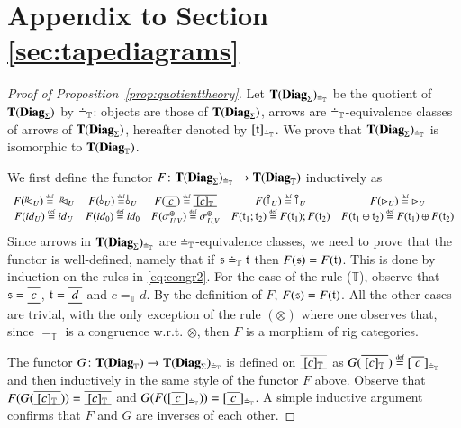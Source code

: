 
\section{Appendix to Section \ref{sec:tapediagrams}}\label{app:sec:tapediagrams}


\begin{proof}[Proof of Proposition~\ref{prop:quotienttheory}]
Let $\mathbf{T}(\mathbf{Diag}_{\Sigma})_{\doteq_{\mathbb{T}}}$ be the quotient of $\mathbf{T}(\mathbf{Diag}_{\Sigma})$ by $\doteq_{\mathbb{T}}$: objects are those of  $\mathbf{T}(\mathbf{Diag}_{\Sigma})$, arrows are $\doteq_{\mathbb{T}}$-equivalence classes of arrows of $\mathbf{T}(\mathbf{Diag}_{\Sigma})$, hereafter denoted by $[\mathfrak{t}]_{\doteq_{\mathbb{T}}}$. We prove that $\mathbf{T}(\mathbf{Diag}_{\Sigma})_{\doteq_{\mathbb{T}}}$ is isomorphic to $\mathbf{T}(\mathbf{Diag}_{\mathbb{T}})$.

We first define the functor $F \colon \mathbf{T}(\mathbf{Diag}_{\Sigma})_{\doteq_{\mathbb{T}}} \to \mathbf{T}(\mathbf{Diag}_{\mathbb{T}})$ inductively as
\[\begin{array}{ccccc}
F(\diagp{U})\defeq \; \diagp{U} &  F(\,\bangp{U})\defeq \bangp{U} & F(\tapeFunct{c})\defeq \tapeFunct{[c]_{\mathbb{T}}} &  F(\cobang{U})\defeq \cobang{U} &
F(\codiag{U})\defeq\codiag{U}  \\
 F(\id{U})\defeq \id{U} & F(\id{\zero})\defeq\id{\zero} & F(\sigma_{U,V}^{\piu})\defeq \sigma_{U,V}^{\piu}& F(\t_1 ; \t_2)\defeq F(\t_1);F(\t_2) & F(\t_1 \piu \t_2) \defeq F(\t_1)\piu F(\t_2)
\end{array}\]
Since arrows in $\mathbf{T}(\mathbf{Diag}_{\Sigma})_{\doteq_{\mathbb{T}}}$ are $\doteq_{\mathbb{T}}$-equivalence classes, we need to prove that the functor is well-defined, namely that if $\mathfrak{s} \doteq_{\mathbb{T}}  \mathfrak{t}$ then $F(\mathfrak{s})=F(\mathfrak{t})$. This is done by induction on the rules in \eqref{eq:congr2}. For the case of the rule ($\mathbb{T}$), observe that $\s=\tape{c}$, $\t=\tape{d}$ and $c=_{\mathbb{T}}d$. By the definition of $F$, $F(\mathfrak{s})=F(\mathfrak{t})$. All the other cases are trivial, with the only exception of the rule $(\otimes)$ where one observes that, since  $=_{\mathbb{T}}$ is a congruence w.r.t. $\otimes$, then $F$ is a morphism of rig categories.

The functor  $G \colon  \mathbf{T}(\mathbf{Diag}_{\mathbb{T}}) \to \mathbf{T}(\mathbf{Diag}_{\Sigma})_{\doteq_{\mathbb{T}}} $ is defined on $\tapeFunct{[c]_{\mathbb{T}}}$ as $G(\tapeFunct{[c]_{\mathbb{T}}})\defeq [\tapeFunct{c}]_{\tapeeqT}$ and then inductively in the same style of the functor $F$ above. Observe that $F(G(\tapeFunct{[c]_{\mathbb{T}}}))=\tapeFunct{[c]_{\mathbb{T}}}$ and $G(F([\tapeFunct{c}]_{\tapeeqT})) = [\tapeFunct{c}]_{\tapeeqT}$. A simple inductive argument confirms that $F$ and $G$ are inverses of each other.
\end{proof}